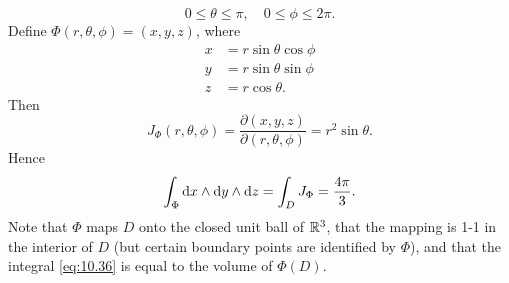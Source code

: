 \begin{newexample}
\begin{enumerate}[(a)]
\begin{equation*}
            0 \leq \theta \leq \pi, 
            \quad
            0 \leq \phi \leq 2\pi.
        \end{equation*}
        Define $\Phi(r,\theta,\phi)=(x,y,z)$, where 
        \begin{align*}
            x &= r \sin \theta \cos \phi \\
            y &= r \sin \theta \sin \phi \\
            z &= r \cos \theta. 
        \end{align*}
        Then 
        \begin{equation*}
            J_{\Phi}(r,\theta,\phi) = 
            \frac{\partial(x,y,z)}{\partial(r,\theta,\phi)} =
            r^2 \sin \theta.
        \end{equation*}
        Hence 
        \begin{equation}
            \label{eq:10.36}
            \int_{\Phi} \d x \wedge \d y \wedge \d z = 
            \int_{D} J_{\Phi} = \frac{4\pi}{3} .
        \end{equation}
        Note that $\Phi$ maps $D$ onto the closed unit ball of ${\protect\mathbb R}^3$, that the mapping is 1-1 in the interior of $D$ (but certain boundary points are identified by $\Phi$), and that the integral \eqref{eq:10.36} is equal to the volume of $\Phi(D)$.
    \end{enumerate}
\end{newexample}

